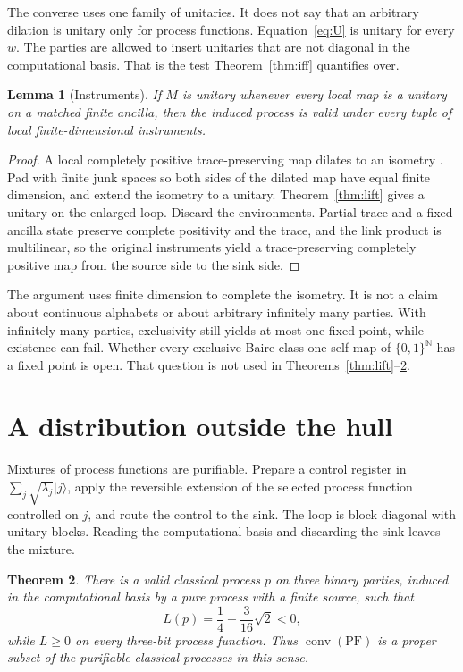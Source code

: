 \documentclass[11pt]{article}
\newtheorem{theorem}{Theorem}
\newtheorem{lemma}[theorem]{Lemma}
\theoremstyle{definition}
\begin{document}
The converse uses one family of unitaries. It does not say that an arbitrary dilation is unitary only for process functions. Equation~\eqref{eq:U} is unitary for every \(w\). The parties are allowed to insert unitaries that are not diagonal in the computational basis. That is the test Theorem~\ref{thm:iff} quantifies over.

\begin{lemma}[Instruments]
\label{lem:valid}
If \(M\) is unitary whenever every local map is a unitary on a matched finite ancilla, then the induced process is valid under every tuple of local finite-dimensional instruments.
\end{lemma}

\begin{proof}
A local completely positive trace-preserving map dilates to an isometry \cite{stinespring1955}. Pad with finite junk spaces so both sides of the dilated map have equal finite dimension, and extend the isometry to a unitary. Theorem~\ref{thm:lift} gives a unitary on the enlarged loop. Discard the environments. Partial trace and a fixed ancilla state preserve complete positivity and the trace, and the link product is multilinear, so the original instruments yield a trace-preserving completely positive map from the source side to the sink side.
\end{proof}

The argument uses finite dimension to complete the isometry. It is not a claim about continuous alphabets or about arbitrary infinitely many parties. With infinitely many parties, exclusivity still yields at most one fixed point, while existence can fail. Whether every exclusive Baire-class-one self-map of \(\{0,1\}^{\mathbb{N}}\) has a fixed point is open. That question is not used in Theorems~\ref{thm:lift}--\ref{thm:sep}.

\section{A distribution outside the hull}
\label{sec:sep}

Mixtures of process functions are purifiable. Prepare a control register in \(\sum_j\sqrt{\lambda_j}\lvert j\rangle\), apply the reversible extension of the selected process function controlled on \(j\), and route the control to the sink. The loop is block diagonal with unitary blocks. Reading the computational basis and discarding the sink leaves the mixture.

\begin{theorem}
\label{thm:sep}
There is a valid classical process \(p\) on three binary parties, induced in the computational basis by a pure process with a finite source, such that
\begin{equation}
\label{eq:L}
L(p)=\frac14-\frac{3}{16}\sqrt{2}<0,
\end{equation}
while \(L\geq 0\) on every three-bit process function. Thus \(\operatorname{conv}(\mathrm{PF})\) is a proper subset of the purifiable classical processes in this sense.
\end{theorem}
\end{document}
